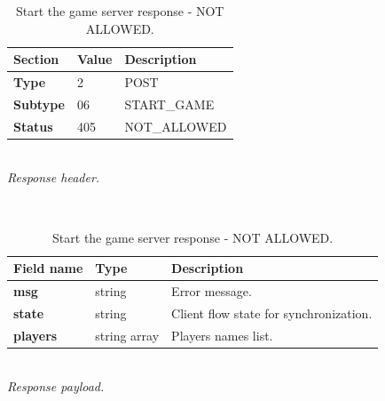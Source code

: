 \documentclass[english, sem, kiv, he, iso690alph, pdf, viewonly]{fasthesis}
\begin{document}
\begin{table}[h!]
	\centering
	\begin{minipage}[b]{1.0\textwidth}
		\centering
		\begin{tabular}{|l|l|l|}
			\hline
			\textbf{Section} & \textbf{Value} & \textbf{Description} \\ \hline
			\textbf{Type} & 2 & \footnotesize{POST} \\ \hline
			\textbf{Subtype} & 06 & \footnotesize{START\_GAME}  \\ \hline
			\textbf{Status} & 405 & \footnotesize{NOT\_ALLOWED} \\ \hline
		\end{tabular} \\
		\textit{Response header.}
	\end{minipage} 
	\\
	\vspace{10pt}
	\begin{minipage}[b]{1.0\textwidth}
		\centering
		\begin{tabular}{|l|l|l|}
			\hline
			\textbf{Field name} & \textbf{Type} & \textbf{Description} \\ \hline
            \textbf{msg} & string & Error message. \\ \hline
			\textbf{state} & string & Client flow state for synchronization. \\ \hline
            \textbf{players} & string array & Players names list. \\ \hline
		\end{tabular} \\
		\textit{Response payload.}
	\end{minipage}	
	\caption{Start the game server response - NOT ALLOWED.}
	\label{tab:start_game_response_not_allowed}
\end{table}
\end{document}
